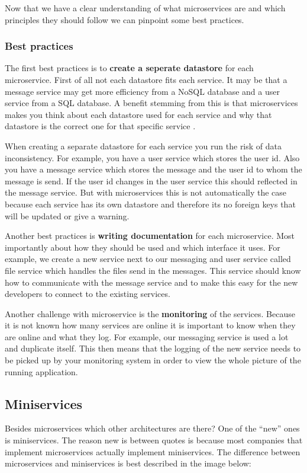 Now that we have a clear understanding of what microservices are and which principles
they should follow we can pinpoint some best practices.

\subsubsection{Best practices}
The first best practices is to \textbf{create a seperate datastore} for each microservice. First of all not each datastore fits each service. It may be that a message service may get more efficiency from a NoSQL database and a user service from a SQL database. A benefit stemming from this is that microservices makes you think about each datastore used for each service and why that datastore is the correct one for that specific service \cite{microservicesNetflix}.

When creating a separate datastore for each service you run the risk of data inconsistency. For example, you have a user service which stores the user id. Also you have a message service which stores the message and the user id to whom the message is send. If the user id changes in the user service this should reflected in the message service. But with microservices this is not automatically the case because each service has its own datastore and therefore its no foreign keys that will be updated or give a warning.

Another best practices is \textbf{writing documentation} \cite{microservicesBestPractice} for each microservice. Most importantly about how they should be used and which interface it uses. For example, we create a new service next to our messaging and user service called file service which handles the files send in the messages. This service should know how to communicate with the message service and to make this easy for the new developers to connect to the existing services.

Another challenge with microservice is the \textbf{monitoring} \cite{microservicesBestPractice} of the services. Because it is not known how many services are online it is important to know when they are online and what they log. For example, our messaging service is used a lot and duplicate itself. This then means that the logging of the new service needs to be picked up by your monitoring system in order to view the whole picture of the running application.

\subsection{Miniservices}
Besides microservices which other architectures are there? One of the “new” ones is
miniservices. The reason new is between quotes is because most companies that implement
microservices actually implement miniservices. The difference between microservices and
miniservices is best described in the image below:

